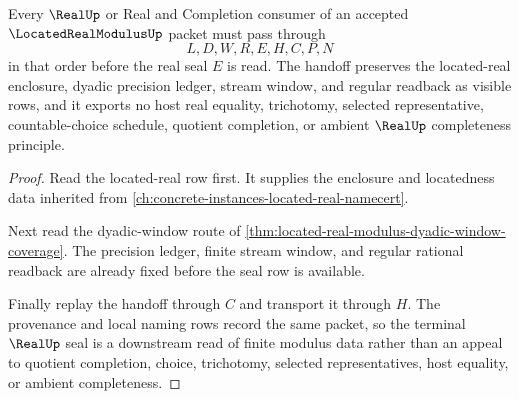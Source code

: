 \begin{theorem}
\label{thm:located-real-modulus-real-seal-handoff}
Every $\RealUp$ or Real and Completion consumer of an accepted $\LocatedRealModulusUp$ packet must pass through
$$
L,D,W,R,E,H,C,P,N
$$
in that order before the real seal $E$ is read. The handoff preserves the located-real enclosure, dyadic precision ledger, stream window, and regular readback as visible rows, and it exports no host real equality, trichotomy, selected representative, countable-choice schedule, quotient completion, or ambient $\RealUp$ completeness principle.
\end{theorem}
\begin{proof}
Read the located-real row first. It supplies the enclosure and locatedness data inherited from \autoref{ch:concrete-instances-located-real-namecert}.

Next read the dyadic-window route of \autoref{thm:located-real-modulus-dyadic-window-coverage}. The precision ledger, finite stream window, and regular rational readback are already fixed before the seal row is available.

Finally replay the handoff through $C$ and transport it through $H$. The provenance and local naming rows record the same packet, so the terminal $\RealUp$ seal is a downstream read of finite modulus data rather than an appeal to quotient completion, choice, trichotomy, selected representatives, host equality, or ambient completeness.
\end{proof}


\begin{closurestatus}{\LocatedRealModulusUp}
  \theoryclosure{\seedClosure}
  \formalstatus{\unformalizedV}
\end{closurestatus}
